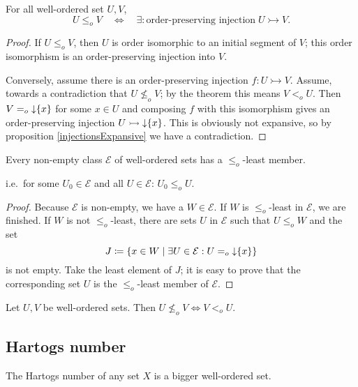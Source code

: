 \begin{corollary}
For all well-ordered set $U,V$,
\[ U \leq_o V \quad \iff \quad \exists: \text{order-preserving injection} \;U\rightarrowtail V. \]
\end{corollary}
\begin{proof}
If $U \leq_o V$, then $U$ is order isomorphic to an initial segment of $V$; this order isomorphism is an order-preserving injection into $V$.

Conversely, assume there is an order-preserving injection $f:U\rightarrowtail V$. Assume, towards a contradiction that $U \nleq_o V$; by the theorem this means $V <_o U$. Then $V=_o \operatorname{\downarrow}\{x\}$ for some $x\in U$ and composing $f$ with this isomorphism gives an order-preserving injection $U\rightarrowtail \operatorname{\downarrow}\{x\}$. This is obviously not expansive, so by proposition \ref{injectionsExpansive} we have a contradiction.
\end{proof}
\begin{corollary}\label{wellfoundednessOfWosetComparison}
Every non-empty class $\mathcal{E}$ of well-ordered sets has a $\leq_o$-least member.
\end{corollary}
i.e.\ for some $U_0\in \mathcal{E}$ and all $U\in \mathcal{E}$: $U_0\leq_o U$.
\begin{proof}
Because $\mathcal{E}$ is non-empty, we have a $W\in\mathcal{E}$. If $W$ is $\leq_o$-least in $\mathcal{E}$, we are finished. If $W$ is not $\leq_o$-least, there are sets $U$ in $\mathcal{E}$ such that $U\leq_o W$ and the set
\[ J \coloneqq \{x\in W\;|\;\exists U\in\mathcal{E}: U =_o \operatorname{\downarrow}\{x\}\} \]
is not empty. Take the least element of $J$; it is easy to prove that the corresponding set $U$ is the $\leq_o$-least member of $\mathcal{E}$.
\end{proof}
\begin{corollary}
Let $U,V$ be well-ordered sets. Then $U\nleq_o V \iff V <_o U$.
\end{corollary}

\subsection{Hartogs number}
The Hartogs number of any set $X$ is a bigger well-ordered set.

